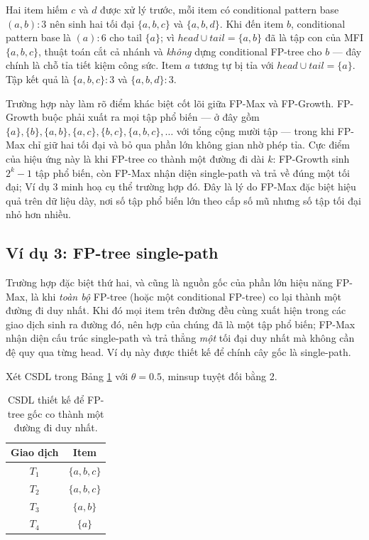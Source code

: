 Hai item hiếm $c$ và $d$ được xử lý trước, mỗi item có conditional pattern base $(a,b):3$ nên sinh hai tối đại $\{a,b,c\}$ và $\{a,b,d\}$. Khi đến item $b$, conditional pattern base là $(a):6$ cho tail $\{a\}$; vì $head \cup tail = \{a,b\}$ đã là tập con của MFI $\{a,b,c\}$, thuật toán cắt cả nhánh và \emph{không} dựng conditional FP-tree cho $b$ --- đây chính là chỗ tỉa tiết kiệm công sức. Item $a$ tương tự bị tỉa với $head\cup tail=\{a\}$. Tập kết quả là $\{a,b,c\}:3$ và $\{a,b,d\}:3$.

Trường hợp này làm rõ điểm khác biệt cốt lõi giữa FP-Max và FP-Growth. FP-Growth buộc phải xuất ra mọi tập phổ biến --- ở đây gồm $\{a\},\{b\},\{a,b\},\{a,c\},\{b,c\},\{a,b,c\},\dots$ với tổng cộng mười tập --- trong khi FP-Max chỉ giữ hai tối đại và bỏ qua phần lớn không gian nhờ phép tỉa. Cực điểm của hiệu ứng này là khi FP-tree co thành một đường đi dài $k$: FP-Growth sinh $2^k-1$ tập phổ biến, còn FP-Max nhận diện single-path và trả về đúng một tối đại; Ví dụ 3 minh hoạ cụ thể trường hợp đó. Đây là lý do FP-Max đặc biệt hiệu quả trên dữ liệu dày, nơi số tập phổ biến lớn theo cấp số mũ nhưng số tập tối đại nhỏ hơn nhiều.

\subsection{Ví dụ 3: FP-tree single-path}
\label{sec:example-singlepath}

Trường hợp đặc biệt thứ hai, và cũng là nguồn gốc của phần lớn hiệu năng FP-Max, là khi \emph{toàn bộ} FP-tree (hoặc một conditional FP-tree) co lại thành một đường đi duy nhất. Khi đó mọi item trên đường đều cùng xuất hiện trong các giao dịch sinh ra đường đó, nên hợp của chúng đã là một tập phổ biến; FP-Max nhận diện cấu trúc single-path và trả thẳng \emph{một} tối đại duy nhất mà không cần đệ quy qua từng head. Ví dụ này được thiết kế để chính cây gốc là single-path.

Xét CSDL trong Bảng \ref{tab:single-db} với $\theta = 0.5$, minsup tuyệt đối bằng 2.

\begin{table}[H]
    \centering
    \caption{CSDL thiết kế để FP-tree gốc co thành một đường đi duy nhất.}
    \label{tab:single-db}
    \begin{tabular}{c c}
        \toprule
        Giao dịch & Item \\
        \midrule
        $T_1$ & $\{a,b,c\}$ \\
        $T_2$ & $\{a,b,c\}$ \\
        $T_3$ & $\{a,b\}$ \\
        $T_4$ & $\{a\}$ \\
        \bottomrule
    \end{tabular}
\end{table}

